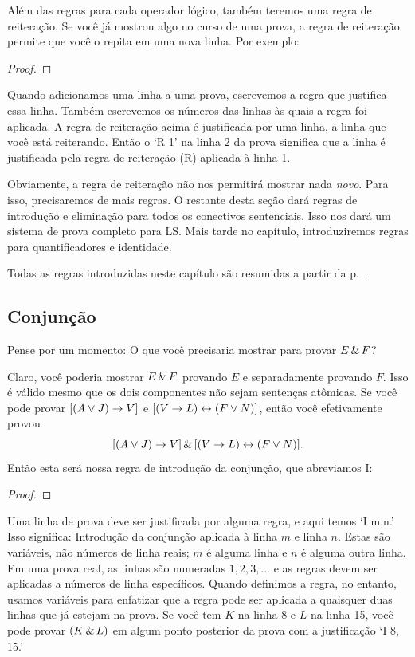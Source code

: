 Além das regras para cada operador lógico, também teremos uma regra de reiteração. Se você já mostrou algo no curso de uma prova, a regra de reiteração permite que você o repita em uma nova linha. Por exemplo:

\begin{proof}
	 
\end{proof}

Quando adicionamos uma linha a uma prova, escrevemos a regra que justifica essa linha. Também escrevemos os números das linhas às quais a regra foi aplicada. A regra de reiteração acima é justificada por uma linha, a linha que você está reiterando. Então o `R 1' na linha 2 da prova significa que a linha é justificada pela regra de reiteração (R) aplicada à linha 1.

Obviamente, a regra de reiteração não nos permitirá mostrar nada \emph{novo}. Para isso, precisaremos de mais regras. O restante desta seção dará regras de introdução e eliminação para todos os conectivos sentenciais. Isso nos dará um sistema de prova completo para LS. Mais tarde no capítulo, introduziremos regras para quantificadores e identidade.

Todas as regras introduzidas neste capítulo são resumidas a partir da p.~\pageref{ProofRules}.


\subsection{Conjunção}

Pense por um momento: O que você precisaria mostrar para provar $E \,\&\, F$?

Claro, você poderia mostrar $E \,\&\, F$ provando $E$ e separadamente provando $F$. 
Isso é válido mesmo que os dois componentes não sejam sentenças atômicas. Se você pode provar $[(A \vee J) \rightarrow V]$ e  $[(V \rightarrow L) \leftrightarrow (F \vee N)]$, então você efetivamente provou
$$[(A \vee J) \rightarrow V] \,\&\, [(V \rightarrow L) \leftrightarrow (F \vee N)].$$
Então esta será nossa regra de introdução da conjunção, que abreviamos {\eand}I:

\begin{proof}
	 
\end{proof}

Uma linha de prova deve ser justificada por alguma regra, e aqui temos `{\eand}I m,n.' Isso significa: Introdução da conjunção aplicada à linha $m$ e linha $n$. Estas são variáveis, não números de linha reais; $m$ é alguma linha e $n$ é alguma outra linha. Em uma prova real, as linhas são numeradas $1, 2, 3, \ldots$ e as regras devem ser aplicadas a números de linha específicos. Quando definimos a regra, no entanto, usamos variáveis para enfatizar que a regra pode ser aplicada a quaisquer duas linhas que já estejam na prova. Se você tem $K$ na linha 8 e $L$ na linha 15, você pode provar $(K\,\&\, L)$ em algum ponto posterior da prova com a justificação `{\eand}I 8, 15.'


